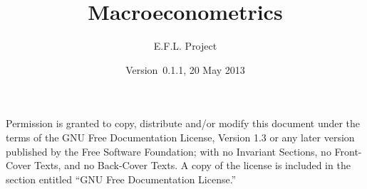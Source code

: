 \documentclass[nofonts,notitlepage]{tufte-latex/tufte-handout}
\title{Macroeconometrics}
\author{E.F.L. Project}
\date{Version~0.1.1, 20 May 2013}
\begin{document}
\maketitle
\tableofcontents

  Permission is granted to
copy, distribute and/or modify this document under the terms of the
GNU Free Documentation License, Version 1.3 or any later version
published by the Free Software Foundation; with no Invariant Sections,
no Front-Cover Texts, and no Back-Cover Texts.  A copy of the license
is included in the section entitled ``GNU Free Documentation
License.''






\appendix

\end{document}
